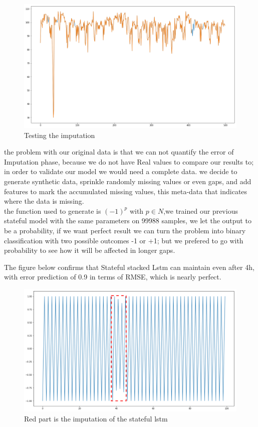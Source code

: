 \begin{figure}[!h]
\centering
\includegraphics[scale=.4]{img/best_result.png}  
\caption{Testing the imputation}
\label{fig:verbose}
\end{figure}
the problem with our original data is that we can not quantify the error of Imputation phase, because we do not have Real values to compare our results to; in order to validate our model we would need a complete data.
we decide to  generate synthetic data, sprinkle randomly missing values or even gaps, and add features to mark the accumulated missing values, this  meta-data that indicates where the data is missing.\\the function used to  generate is $(-1)^{p}$ with $p \in N$,we trained our previous stateful model with the same parameters on 99988 samples, we let the output to be a probability, if we want perfect result we can turn the problem into binary classification with two possible outcomes -1 or +1; but we prefered to go with probability to see how it will be affected in longer gaps.
\newpage

The figure below confirms that Stateful stacked Lstm can  maintain even after 4h, with error prediction  of  0.9 in terms of RMSE, which is nearly perfect.    

\begin{figure}[!h]
\centering
\includegraphics[scale=.4]{img/synthetic_data_lstm.png}  
\caption{Red part is the imputation of the stateful lstm }
\label{fig:state_lstm}
\end{figure}


